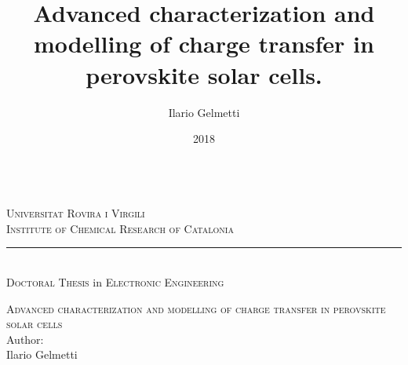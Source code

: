 \documentclass[b5paper, 12pt, openright]{book} %
\title{Advanced characterization and modelling of charge transfer in perovskite solar cells.}
\author{Ilario Gelmetti}
\date{2018}
\begin{document}
\nocite{Gelmetti2017,Moia2019,Gelmetti2019}

\pagestyle{plain}


\frontmatter

{\let\cleardoublepage\clearpage %

\begin{titlepage}\begin{center}



		\\%
		\bigskip
		\large{\textsc{Universitat Rovira i Virgili\\ Institute of Chemical Research of Catalonia}}\\
		\rule{5cm}{1pt}\\
		{
		\bigskip
		{\textsc{Doctoral Thesis} in \textsc{Electronic Engineering}}}\\
		\bigskip\bigskip\vfill

		\huge{\textsc{Advanced characterization and modelling of charge transfer in perovskite solar cells}}\\
		\bigskip\bigskip\vfill
		\footnotesize{Author:}\\
		\large{Ilario Gelmetti}\\
		\makebox[.2\textwidth]{\rule{0pt}{.02\textheight}}\\
	\end{center}
	\begin{small}
\end{small}
\end{titlepage}}
\end{document}
